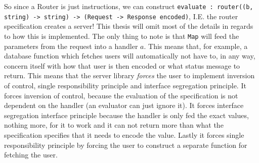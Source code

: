 So since a Router is just instructions, we can construct \texttt{evaluate :
router((b, string) -> string) -> (Request -> Response encoded)}, I.E. the router
specification creates a server! This thesis will omit most of the details in
regards to how this is implemented. The only thing to note is that \texttt{Map}
will feed the parameters from the request into a handler $a$. This means that,
for example, a database function which fetches users will automatically not have
to, in any way, concern itself with how that user is then encoded or what status
message to return. This means that the server library \textit{forces} the user
to implement inversion of control, single responsibility principle and interface
segregation principle. It forces inversion of control, because the evaluation of
the specification is not dependent on the handler (an evaluator can just ignore
it). It forces interface segregation interface principle because the handler is
only fed the exact values, nothing more, for it to work and it can not return
more than what the specification specifies that it needs to encode the value.
Lastly it forces single responsibility principle by forcing the user to
construct a separate function for fetching the user.

